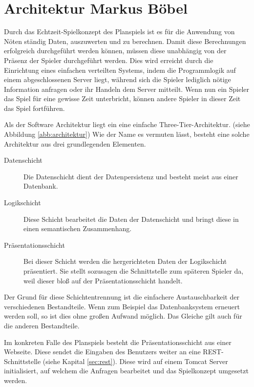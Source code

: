 \section{Architektur \textnormal{\textsf{\small{Markus Böbel}}}}

Durch das Echtzeit-Spielkonzept des Planspiels ist es für die Anwendung von Nöten ständig Daten, auszuwerten und zu berechnen. Damit diese Berechnungen erfolgreich durchgeführt werden können, müssen diese unabhängig von der Präsenz der Spieler durchgeführt werden. Dies wird erreicht durch die Einrichtung eines einfachen verteilten Systems, indem die Programmlogik auf einem abgeschlossenen Server liegt, während sich die Spieler lediglich nötige Information anfragen oder ihr Handeln dem Server mitteilt.
Wenn nun ein Spieler das Spiel für eine gewisse Zeit unterbricht, können andere Spieler in dieser Zeit das Spiel fortführen.

Als der Software Architektur liegt ein eine einfache Three-Tier-Architektur. (siehe Abbildung \ref{abb:architektur})
Wie der Name es vermuten lässt, besteht eine solche Architektur aus drei grundlegenden Elementen.

\begin{description}
	\item[Datenschicht] Die Datenschicht dient der Datenpersistenz und besteht meist aus einer Datenbank.
	\item[Logikschicht] Diese Schicht bearbeitet die Daten der Datenschicht und bringt diese in einen semantischen Zusammenhang. 
	\item[Präsentationsschicht] Bei dieser Schicht werden die hergerichteten Daten der Logikschicht präsentiert. Sie stellt sozusagen die Schnittstelle zum späteren Spieler da, weil dieser bloß auf der Präsentationsschicht handelt.
\end{description}
Der Grund für diese Schichtentrennung ist die einfachere Austauschbarkeit der verschiedenen Bestandteile. Wenn zum Beispiel das Datenbanksystem erneuert werden soll, so ist dies ohne großen Aufwand möglich. Das Gleiche gilt auch für die anderen Bestandteile.

Im konkreten Falle des Planspiels besteht die Präsentationsschicht aus einer Webseite. Diese sendet die Eingaben des Benutzers weiter an eine REST-Schnittstelle (siehe Kapital \ref{sec:rest}). Diese wird auf einem Tomcat Server initialisiert, auf welchem die Anfragen bearbeitet und das Spielkonzept umgesetzt werden.


